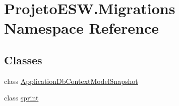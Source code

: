 \hypertarget{namespace_projeto_e_s_w_1_1_migrations}{}\section{Projeto\+E\+S\+W.\+Migrations Namespace Reference}
\label{namespace_projeto_e_s_w_1_1_migrations}
\subsection*{Classes}
\begin{DoxyCompactItemize}
\item 
class \mbox{\hyperlink{class_projeto_e_s_w_1_1_migrations_1_1_application_db_context_model_snapshot}{Application\+Db\+Context\+Model\+Snapshot}}
\item 
class \mbox{\hyperlink{class_projeto_e_s_w_1_1_migrations_1_1sprint}{sprint}}
\end{DoxyCompactItemize}
